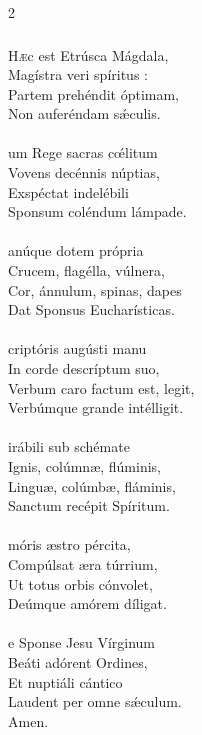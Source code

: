 \documentclass[9pt,twoside]{extarticle}
\begin{document}
\begin{multicols}{2}
{{\subsubsection*{\center {}}
\begin{center}\end{center}
\lettrine{H}æc est Etrúsca Mágdala,\\
Magístra veri spíritus :\\
Partem prehéndit óptimam,\\
Non auferéndam sǽculis.\\
\\
um Rege sacras cœ́litum\\
Vovens decénnis núptias,\\
Exspéctat indelébili\\
Sponsum coléndum lámpade.\\
\\
anúque dotem própria\\
Crucem, flagélla, vúlnera,\\
Cor, ánnulum, spinas, dapes\\
Dat Sponsus Eucharísticas.\\
\\
criptóris augústi manu\\
In corde descríptum suo,\\
Verbum caro factum est, legit,\\
Verbúmque grande intélligit.\\
\\
irábili sub schémate\\
Ignis, colúmnæ, flúminis,\\
Linguæ, colúmbæ, fláminis,\\
Sanctum recépit Spíritum.\\
\\
móris æstro pércita,\\
Compúlsat æra túrrium,\\
Ut totus orbis cónvolet,\\
Deúmque amórem díligat.\\
\\
e Sponse Jesu Vírginum\\
Beáti adórent Ordines,\\
Et nuptiáli cántico\\
Laudent per omne sǽculum.\\
Amen.

}}
\end{multicols}
\end{document}
